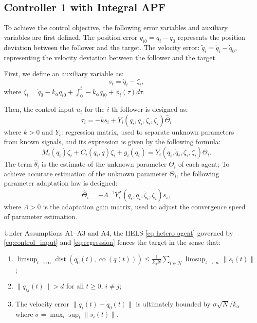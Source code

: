 \subsection{Controller 1 with Integral APF}

To achieve the control objective, the following error variables and auxiliary variables are first defined.
The position error \( {q}_{i0} = q_i - q_0 \) represents the position deviation between the follower and the target.
The velocity error: \( \dot{\tilde{q}}_i = \dot{q}_i - \dot{q}_0 \), representing the velocity deviation between the follower and the target.

First, we define an auxiliary variable as:
\begin{equation}\label{eq:sliding_var}
	s_i = \dot{q}_i - \zeta_i,
\end{equation}
where $\zeta_i = \dot{q}_0 - k_{\alpha} {q}_{i0} + \int_0^t  -k_{\alpha} {q}_{i0} + \phi_i(\tau) d \tau$.

Then, the control input \( u_i \) for the \( i \)-th follower is designed as:
\begin{equation}\label{eq:control_input}
	\tau_i = -k s_i + Y_i(q_{i},\dot{q}_{i},\dot{\zeta}_i,\zeta_i) \hat{\Theta}_i 
\end{equation}
where \( k > 0 \) and \( Y_i \): regression matrix, used to separate unknown parameters from known signals, and its expression is given by the following formula:
	\begin{equation}\label{eq:regression}
		M_i(q_i)\dot{\zeta}_i + C_i(q_i,\dot{q})\zeta_i + g_i(q_i)=Y_{i}(q_{i},\dot{q}_{i},\dot{\zeta}_i,\zeta_i)\Theta_{i}.
	\end{equation}
The term \( \hat{\theta}_i \) is the estimate of the unknown parameter \( \Theta_i \)  of  each agent;
To achieve accurate estimation of the unknown parameter \( \Theta_i \), the following parameter adaptation law is designed:
\begin{equation}\label{eq:adaptation}
	\dot{\hat{\Theta}}_i = -\Lambda^{-1} Y_i^T(q_{i},\dot{q}_{i},\dot{\zeta}_i,\zeta_i) s_i, 
\end{equation}
where \( \Lambda > 0 \) is the adaptation gain matrix, used to adjust the convergence speed of parameter estimation.

\begin{theorem}
	Under Assumptions A1--A3 and A4, the HELS \eqref{eq hetero agent} governed by \eqref{eq:control_input} and \eqref{eq:regression} fences the target in the sense that:
	\begin{enumerate}
		\item[\textbf{P1}] $\limsup_{t\to\infty} \operatorname{dist}(q_0(t), \operatorname{co}(q(t))) \leq \frac{1}{k_\alpha N}\sum_{i\in\mathcal{N}} \limsup_{t\to\infty}\|\dot{s}_i(t)\|$;
		\item[\textbf{P2}] $\|q_{ij}(t)\| > d$ for all $t \geq 0$, $i \neq j$;
		\item[\textbf{P3}] The velocity error $\|\dot{q}_i(t) - \dot{q}_0(t)\|$ is ultimately bounded by $\sigma\sqrt{N}/k_\alpha$ where $\sigma = \max_i \sup_t \|\dot{s}_i(t)\|$.
	\end{enumerate}
\end{theorem}

